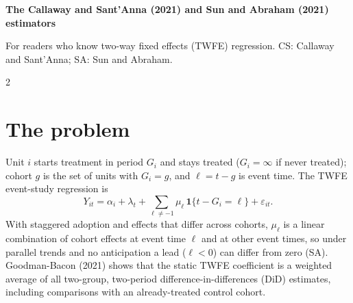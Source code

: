 \documentclass[10pt,letterpaper]{article}
\newcommand{\ind}{\mathbf{1}}
\begin{document}
{\large\bfseries The Callaway and Sant'Anna (2021) and Sun and Abraham (2021) estimators\par}
\vspace{1pt}
For readers who know two-way fixed effects (TWFE) regression. CS: Callaway and Sant'Anna; SA: Sun and Abraham.

\begin{multicols}{2}
\section{The problem}
Unit $i$ starts treatment in period $G_i$ and stays treated ($G_i=\infty$ if never treated); cohort $g$ is the set of units with $G_i=g$, and $\ell=t-g$ is event time. The TWFE event-study regression is
\[
Y_{it}=\alpha_i+\lambda_t+\textstyle\sum_{\ell\neq-1}\mu_\ell\,\ind\{t-G_i=\ell\}+\varepsilon_{it}.
\]
With staggered adoption and effects that differ across cohorts, $\mu_\ell$ is a linear combination of cohort effects at event time $\ell$ and at other event times, so under parallel trends and no anticipation a lead ($\ell<0$) can differ from zero (SA). Goodman-Bacon (2021) shows that the static TWFE coefficient is a weighted average of all two-group, two-period difference-in-differences (DiD) estimates, including comparisons with an already-treated control cohort.

{\centering
{}\par}


\end{multicols}
\end{document}
